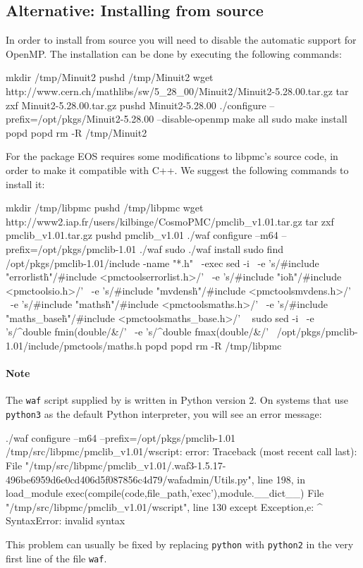 \subsection{Alternative: Installing from source}

In order to install  from source you will need to
disable the automatic support for OpenMP. The installation can be done by
executing the following commands:
\begin{commandline}
mkdir /tmp/Minuit2
pushd /tmp/Minuit2
wget http://www.cern.ch/mathlibs/sw/5_28_00/Minuit2/Minuit2-5.28.00.tar.gz
tar zxf Minuit2-5.28.00.tar.gz
pushd Minuit2-5.28.00
./configure --prefix=/opt/pkgs/Minuit2-5.28.00 --disable-openmp
make all
sudo make install
popd
popd
rm -R /tmp/Minuit2
\end{commandline}

For the  package EOS requires some modifications to libpmc's
source code, in order to make it compatible with C++. We suggest the following
commands to install it:
\begin{commandline}
mkdir /tmp/libpmc
pushd /tmp/libpmc
wget http://www2.iap.fr/users/kilbinge/CosmoPMC/pmclib_v1.01.tar.gz
tar zxf pmclib_v1.01.tar.gz
pushd pmclib_v1.01
./waf configure --m64 --prefix=/opt/pkgs/pmclib-1.01
./waf
sudo ./waf install
sudo find /opt/pkgs/pmclib-1.01/include -name "*.h" \
    -exec sed -i \
    -e 's/#include "errorlist\.h"/#include <pmctools\/errorlist.h>/' \
    -e 's/#include "io\.h"/#include <pmctools\/io.h>/' \
    -e 's/#include "mvdens\.h"/#include <pmctools\/mvdens.h>/' \
    -e 's/#include "maths\.h"/#include <pmctools\/maths.h>/' \
    -e 's/#include "maths_base\.h"/#include <pmctools\/maths_base.h>/' \
    {} \;
sudo sed -i \
    -e 's/^double fmin(double/\/\/&/' \
    -e 's/^double fmax(double/\/\/&/' \
    /opt/pkgs/pmclib-1.01/include/pmctools/maths.h
popd
popd
rm -R /tmp/libpmc
\end{commandline}

\paragraph{Note} The \texttt{waf} script supplied by  is written in Python version 2. On
systems that use \texttt{python3} as the default Python interpreter, you will see an error message:
\begin{file}
./waf configure --m64 --prefix=/opt/pkgs/pmclib-1.01
/tmp/src/libpmc/pmclib_v1.01/wscript: error: Traceback (most recent call last):
  File "/tmp/src/libpmc/pmclib_v1.01/.waf3-1.5.17-496be6959d6e0cd406d5f087856c4d79/wafadmin/Utils.py", line 198, in load_module
    exec(compile(code,file_path,'exec'),module.__dict__)
  File "/tmp/src/libpmc/pmclib_v1.01/wscript", line 130
    except Exception,e:
                    ^
SyntaxError: invalid syntax
\end{file}
This problem can usually be fixed by replacing \texttt{python} with \texttt{python2} in the very first
line of the file \texttt{waf}.

